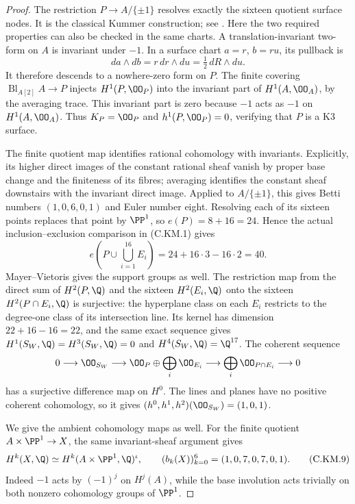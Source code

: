 \begin{proof}
The restriction $P\to A/\{\pm1\}$ resolves exactly the
sixteen quotient surface nodes. It is the classical Kummer
construction; see \cite[Chapter~1, Example~1.3(iii)]{HuybrechtsK3Draft}.
Here the two required properties can also be checked in the
same charts. A translation-invariant two-form on $A$ is
invariant under $-1$. In a surface chart $a=r$, $b=ru$,
its pullback is
\[
                da\wedge db=r\,dr\wedge du
                            =\tfrac12\,dR\wedge du.   \tag{C.KM.7}
\]
It therefore descends to a nowhere-zero form on $P$.
The finite covering $\operatorname{Bl}_{A[2]}A\to P$
injects $H^1(P,\OO_P)$ into the invariant part of
$H^1(A,\OO_A)$, by the averaging trace. This invariant
part is zero because $-1$ acts as $-1$ on $H^1(A,\OO_A)$.
Thus $K_P=\OO_P$ and $h^1(P,\OO_P)=0$, verifying that
$P$ is a K3 surface.

The finite quotient map identifies rational cohomology with
invariants. Explicitly, its higher direct images of the
constant rational sheaf vanish by proper base change and
the finiteness of its fibres; averaging identifies the
constant sheaf downstairs with the invariant direct image.
Applied to $A/\{\pm1\}$, this gives Betti numbers
$(1,0,6,0,1)$ and Euler number eight. Resolving each of its
sixteen points replaces that point by $\PP^1$, so
$e(P)=8+16=24$. Hence the actual inclusion--exclusion
comparison in (C.KM.1) gives
\[
          e\left(P\cup\bigcup_{i=1}^{16}E_i\right)
                    =24+16\cdot3-16\cdot2=40.          \tag{C.KM.8}
\]
Mayer--Vietoris gives the support groups as well. The restriction
map from the direct sum of $H^2(P,\Q)$ and the sixteen
$H^2(E_i,\Q)$ onto the sixteen $H^2(P\cap E_i,\Q)$ is
surjective: the hyperplane class on each $E_i$ restricts to
the degree-one class of its intersection line. Its kernel
has dimension $22+16-16=22$, and the same exact sequence
gives $H^1(S_W,\Q)=H^3(S_W,\Q)=0$ and
$H^4(S_W,\Q)=\Q^{17}$. The coherent sequence
\[
 0\longrightarrow\OO_{S_W}\longrightarrow
 \OO_P\oplus\bigoplus_i\OO_{E_i}
 \longrightarrow\bigoplus_i\OO_{P\cap E_i}
 \longrightarrow0
\]
has a surjective difference map on $H^0$. The lines and planes
have no positive coherent cohomology, so it gives
$(h^0,h^1,h^2)(\OO_{S_W})=(1,0,1)$.

We give the ambient cohomology maps as well. For the finite
quotient $A\times\PP^1\to X$, the same invariant-sheaf
argument gives
\[
 H^k(X,\Q)\simeq H^k(A\times\PP^1,\Q)^{\iota},
 \qquad (b_k(X))_{k=0}^6=(1,0,7,0,7,0,1).              \tag{C.KM.9}
\]
Indeed $-1$ acts by $(-1)^j$ on $H^j(A)$, while the
base involution acts trivially on both nonzero cohomology
groups of $\PP^1$.


\end{proof}
